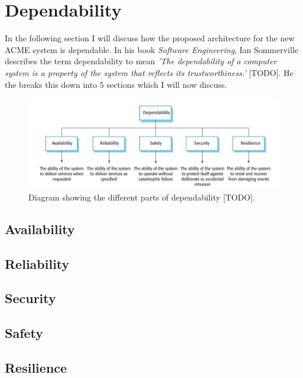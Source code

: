 \section{Dependability}
  In the following section I will discuss how the proposed architecture for the new ACME system is dependable. In his book \textit{Software Engineering}, Ian 
  Sommerville describes the term dependability to mean \textit{'The dependability of a computer system is a property of the system that reflects its 
  trustworthiness.'} [TODO]. He the breaks this down into 5 sections which I will now discuss.

  \begin{figure}[H]
    \centering
    \includegraphics[width=12cm]{assets/dependability.png}
    \caption{Diagram showing the different parts of dependability [TODO].}
    \label{fig:dependability}
  \end{figure}

  \subsection{Availability}

  \subsection{Reliability}

  \subsection{Security}

  \subsection{Safety}

  \subsection{Resilience}

\newpage
